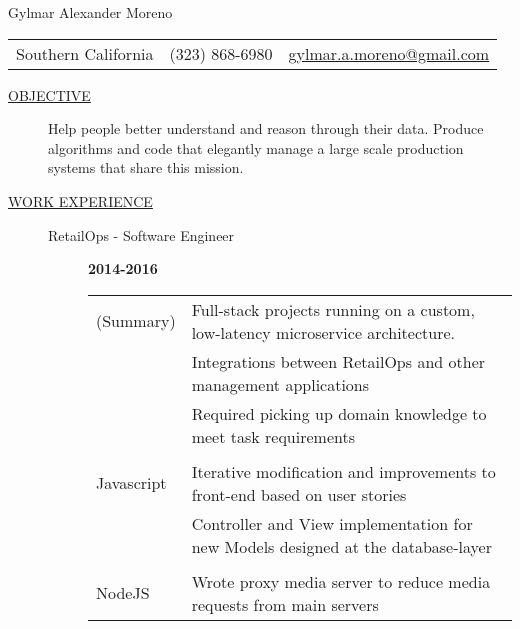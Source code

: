 \documentclass[12pt]{article}
\begin{document}
    \begin{center}
        {\LARGE Gylmar Alexander Moreno}
        \\
        \begin{tabular}{l|l|l}
            Southern California & (323) 868-6980 &
            \href{mailto:gylmar.a.moreno@gmail.com}{gylmar.a.moreno@gmail.com}
        \end{tabular}
    \end{center}

    \begin{description}
        \item[\underline{OBJECTIVE}] Help people better understand and reason through their data. Produce algorithms and code that elegantly manage a large scale production systems that share this mission.
            \iffalse\begin{flushleft} Update and manage a large scale distributed production system.  \end{flushleft} \fi
            \iffalse Produce algorithms and code that elegantly manage a large scale production system that\fi
        \item[\underline{WORK EXPERIENCE}] \hfill
            \begin{description}
                \item[RetailOps - Software Engineer] \hfill \textbf{2014-2016}\\
                    \begin{tabular}{l|l}
                        (Summary)  & Full-stack projects running on a custom, low-latency microservice architecture.\\
                                   & Integrations between RetailOps and other management applications \\
                                   & Required picking up domain knowledge to meet task requirements\\
                                     \\
                        Javascript & Iterative modification and improvements to front-end based on user stories\\
                                   & Controller and View implementation for new Models designed at the database-layer\\
                                     \\
                        NodeJS     & Wrote proxy media server to reduce media requests from main servers \\

\end{tabular}
\end{description}
\end{description}
\end{document}
